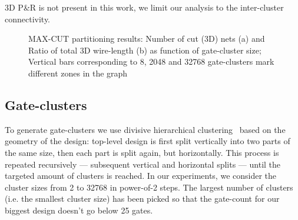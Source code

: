 \documentclass[conference]{IEEEtran}
\begin{document}
3D P\&R is not present in this work, we limit our analysis to the inter-cluster connectivity.



\begin{figure}
\centering
{}
{}
\caption{MAX-CUT partitioning results: Number of cut (3D) nets (a) and Ratio of total 3D wire-length (b) as function of gate-cluster size; Vertical bars corresponding to 8, 2048 and 32768 gate-clusters mark different zones in the graph}
\label{fig:3Dnets}
\end{figure} 

\subsection{Gate-clusters}\label{sec:gate-cluster}
To generate gate-clusters we use divisive hierarchical clustering~\cite{Rokach2005} based on the geometry of the design: top-level design is first split vertically into two parts of the same size, then each part is split again, but horizontally. This process is repeated recursively --- subsequent vertical and horizontal splits --- until the targeted amount of clusters is reached. In our experiments, we consider the cluster sizes from 2 to 32768 in power-of-2 steps. The largest number of clusters (i.e. the smallest cluster size) has been picked so that the gate-count for our biggest design doesn't go below 25 gates.
\end{document}
